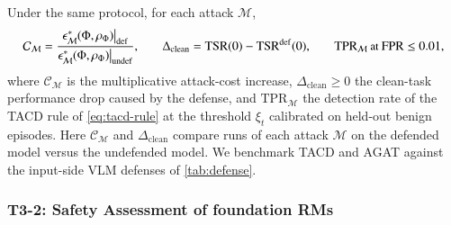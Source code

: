 \documentclass[11pt,letterpaper]{article}
\begin{document}
Under the same protocol, for each attack $\mathcal{M}$,
\vspace{-1.5ex}\begin{equation}
  \small
\mathcal{C}_{\mathcal{M}}=\frac{\epsilon^{*}_{\mathcal{M}}(\Phi,\rho_{\Phi})\big|_{\mathrm{def}}}
{\epsilon^{*}_{\mathcal{M}}(\Phi,\rho_{\Phi})\big|_{\mathrm{undef}}},
\qquad
\Delta_{\mathrm{clean}}=\mathrm{TSR}(0)-\mathrm{TSR}^{\mathrm{def}}(0),
\qquad
\mathrm{TPR}_{\mathcal{M}}\ \text{at}\ \mathrm{FPR}\le0.01,
\label{eq:defense-metrics}
\vspace{-1.5ex}\end{equation}
where $\mathcal{C}_{\mathcal{M}}$ is the multiplicative attack-cost increase, $\Delta_{\mathrm{clean}}\ge0$ the clean-task performance drop caused by the defense, and $\mathrm{TPR}_{\mathcal{M}}$ the detection rate of the TACD rule of \autoref{eq:tacd-rule} at the threshold
$\xi_{t}$ calibrated on held-out benign episodes. 
Here $\mathcal{C}_{\mathcal{M}}$ and $\Delta_{\mathrm{clean}}$ compare runs of each attack $\mathcal{M}$ on the defended model versus the undefended model. We benchmark TACD and AGAT against the input-side VLM defenses of \autoref{tab:defense}. %

\subsubsection{T3-2: Safety Assessment of foundation RMs} \label{sec:t3_2}
\end{document}
